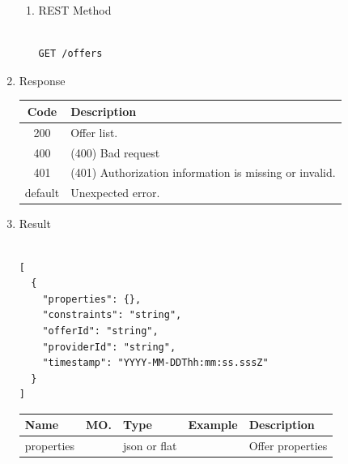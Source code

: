 \begin{enumerate}
\begin{enumerate}


\item REST Method

\begin{tcolorbox}[boxrule=0pt, frame empty]
\begin{verbatim} 

GET /offers

\end{verbatim}
\end{tcolorbox}

\end{enumerate}

\item Response

\begin{center}
\begin{tabular}{|c|l|} 
\hline
\rowcolor{lightgray}	Code 		& 	Description \\
\hline
200	 		&	Offer list. \\
\hline
400			&	(400) Bad request \\
\hline
401			&	(401) Authorization information is missing or invalid. \\
\hline
default		&	Unexpected error. \\
\hline
\end{tabular}
\end{center}


\item Result

\begin{tcolorbox}[boxrule=0pt, frame empty]
\begin{verbatim}

[
  {
    "properties": {},
    "constraints": "string",
    "offerId": "string",
    "providerId": "string",
    "timestamp": "YYYY-MM-DDThh:mm:ss.sssZ"
  }
]

\end{verbatim}
\end{tcolorbox}

\begin{center}
\begin{tabular}{|p{3cm}|l|p{3cm}|p{3cm}|p{4cm}|} 
\hline
\rowcolor{lightgray}	Name	& MO.	& Type	& Example & 	Description \\
\hline

properties	& 	& 	json or flat	&		&	Offer properties \\ 


\end{tabular}
\end{center}
\end{enumerate}
